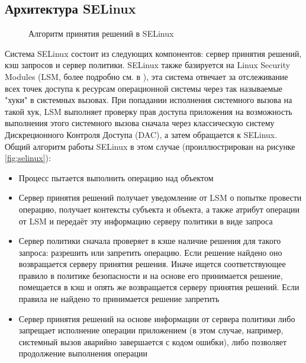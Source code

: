 \subsection{Архитектура SELinux} 
\begin{figure}
\centering
{} 
\caption{Алгоритм принятия решений в SELinux}
\end{figure}
Система SELinux состоит из следующих компонентов: сервер принятия
решений, кэш запросов и сервер политики.  SELinux также базируется на
Linux Security Modules (LSM, более подробно см. в \cite{LSM}), эта
система отвечает за отслеживание всех точек доступа к ресурсам
операционной системы через так называемые "хуки" в системных вызовах.
При попадании исполнения системного вызова на такой хук, LSM выполняет
проверку прав доступа приложения на возможность выполнения этого
системного вызова сначала через классическую систему Дискреционного
Контроля Доступа (DAC), а затем обращается к SELinux.  Общий алгоритм
работы SELinux в этом случае (проиллюстрирован на рисунке
\ref{fig:selinux}): 
\begin{itemize}
\item Процесс пытается выполнить операцию над объектом 
\item Сервер принятия решений получает уведомление от LSM о попытке
    провести операцию, получает контексты субъекта и объекта, а также
    атрибут операции от LSM и передаёт эту информацию серверу политики в
    виде запроса 
\item Сервер политики сначала проверяет в кэше наличие решения для
    такого запроса: разрешить или запретить операцию. Если решение
    найдено оно возвращается серверу принятия решения. Иначе ищется
    соответствующее правило в политике безопасности и на основе его
    принимается решение, помещается в кэш и опять же возвращается
    серверу принятия решений. Если правила не найдено то принимается
    решение запретить 
\item Сервер принятия решений на основе информации от сервера политики
    либо запрещает исполнение операции приложением (в этом случае,
    например, системный вызов аварийно завершается с кодом ошибки), либо
    позволяет продолжение выполнения операции 
\end{itemize}

